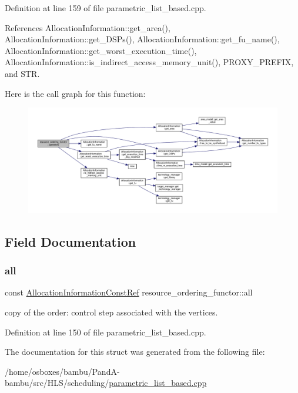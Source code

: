 Definition at line 159 of file parametric\+\_\+list\+\_\+based.\+cpp.



References Allocation\+Information\+::get\+\_\+area(), Allocation\+Information\+::get\+\_\+\+D\+S\+Ps(), Allocation\+Information\+::get\+\_\+fu\+\_\+name(), Allocation\+Information\+::get\+\_\+worst\+\_\+execution\+\_\+time(), Allocation\+Information\+::is\+\_\+indirect\+\_\+access\+\_\+memory\+\_\+unit(), P\+R\+O\+X\+Y\+\_\+\+P\+R\+E\+F\+IX, and S\+TR.

Here is the call graph for this function\+:
\nopagebreak
\begin{figure}[H]
\begin{center}
\leavevmode
\includegraphics[width=350pt]{dd/db9/structresource__ordering__functor_a2a3ad6ccd7fc19d0b26caacb0d78991f_cgraph}
\end{center}
\end{figure}


\subsection{Field Documentation}
\mbox{\label{structresource__ordering__functor_a1e053666eb3ddc25fe3bfb68b35296b1}} 
\subsubsection{\texorpdfstring{all}{all}}
{\footnotesize\ttfamily const \hyperlink{allocation__information_8hpp_a54287618a63bf87e31ddb17ba01e7ca7}{Allocation\+Information\+Const\+Ref} resource\+\_\+ordering\+\_\+functor\+::all\hspace{0.3cm}{\ttfamily [private]}}



copy of the order\+: control step associated with the vertices. 



Definition at line 150 of file parametric\+\_\+list\+\_\+based.\+cpp.



The documentation for this struct was generated from the following file\+:\begin{DoxyCompactItemize}
\item 
/home/osboxes/bambu/\+Pand\+A-\/bambu/src/\+H\+L\+S/scheduling/\hyperlink{parametric__list__based_8cpp}{parametric\+\_\+list\+\_\+based.\+cpp}\end{DoxyCompactItemize}
